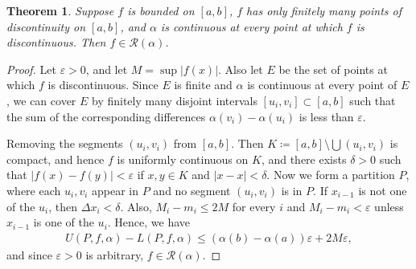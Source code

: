 \documentclass[10pt]{book}
\newtheorem{theorem}{Theorem}[chapter]
\theoremstyle{definition}
\numberwithin{equation}{chapter}
\begin{document}
\begin{theorem}
Suppose $f$ is bounded on $[a,b]$, $f$ has only finitely many points of discontinuity on $[a,b]$, and $\alpha$ is continuous at every point at which $f$ is discontinuous. Then $f \in \mathcal{R}(\alpha)$.
\end{theorem}
\begin{proof}
Let $\varepsilon > 0$, and let $M = \sup \left|f(x)\right|$. Also let $E$ be the set of points at which $f$ is discontinuous. Since $E$ is finite and $\alpha$ is continuous at every point of $E$, we can cover $E$ by finitely many disjoint intervals $[u_i,v_i] \subset [a,b]$ such that the sum of the corresponding differences $\alpha(v_i) - \alpha(u_i)$ is less than $\varepsilon$. 

Removing the segments $(u_i,v_i)$ from $[a,b]$. Then $K \coloneqq [a,b] \setminus \bigcup (u_i,v_i)$ is compact, and hence $f$ is uniformly continuous on $K$, and there exists $\delta > 0$ such that $\left|f(x) - f(y)\right| < \varepsilon$ if $x,y \in K$ and $\left|x - x\right| < \delta$. Now we form a partition $P$, where each $u_i,v_i$ appear in $P$ and no segment $(u_i,v_i)$ is in $P$. If $x_{i-1}$ is not one of the $u_i$, then $\Delta x_i < \delta$. 
Also, $M_i - m_i \leq 2M$ for every $i$ and $M_i - m_i < \varepsilon$ unless $x_{i-1}$ is one of the $u_i$. Hence, we have
\begin{align*}
    U(P,f,\alpha) - L(P,f,\alpha) \leq \left(\alpha(b) - \alpha(a)\right) \varepsilon + 2M \varepsilon,
\end{align*}
and since $\varepsilon > 0$ is arbitrary, $f \in \mathcal{R}(\alpha)$.
\end{proof}

\medskip





















\newpage


\end{document}
